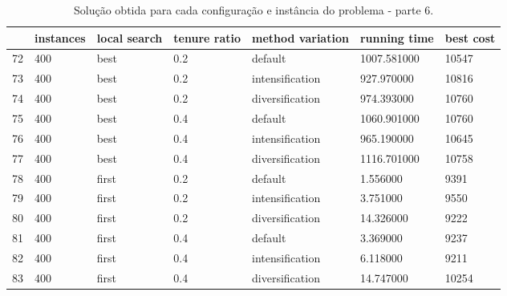 \begin{landscape}
\begin{table}
\centering
\begin{tabular}{lllllll}
\toprule
{} & instances & local search & tenure ratio & method variation & running time & best cost \\
\midrule
72 &       400 &         best &          0.2 &          default &  1007.581000 &     10547 \\
73 &       400 &         best &          0.2 &  intensification &   927.970000 &     10816 \\
74 &       400 &         best &          0.2 &  diversification &   974.393000 &     10760 \\
75 &       400 &         best &          0.4 &          default &  1060.901000 &     10760 \\
76 &       400 &         best &          0.4 &  intensification &   965.190000 &     10645 \\
77 &       400 &         best &          0.4 &  diversification &  1116.701000 &     10758 \\
78 &       400 &        first &          0.2 &          default &     1.556000 &      9391 \\
79 &       400 &        first &          0.2 &  intensification &     3.751000 &      9550 \\
80 &       400 &        first &          0.2 &  diversification &    14.326000 &      9222 \\
81 &       400 &        first &          0.4 &          default &     3.369000 &      9237 \\
82 &       400 &        first &          0.4 &  intensification &     6.118000 &      9211 \\
83 &       400 &        first &          0.4 &  diversification &    14.747000 &     10254 \\
\bottomrule
\end{tabular}
\caption{Solução obtida para cada configuração e instância do problema - parte 6.}
\label{table:all-data-6}
\end{table}

\end{landscape}
